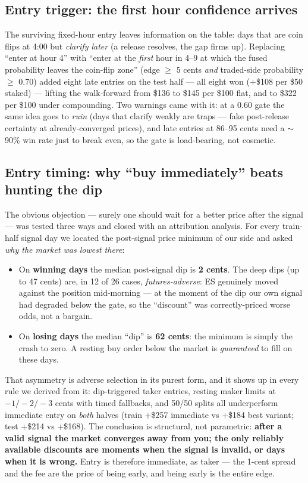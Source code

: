 \documentclass[11pt,a4paper]{article}
\begin{document}
\subsection{Entry trigger: the first hour confidence arrives}

The surviving fixed-hour entry leaves information on the table: days that are
coin flips at 4:00 but \emph{clarify later} (a release resolves, the gap
firms up). Replacing ``enter at hour 4'' with ``enter at the \emph{first}
hour in 4--9 at which the fused probability leaves the coin-flip zone''
(edge $\ge$ 5 cents \emph{and} traded-side probability $\ge$ 0.70) added
eight late entries on the test half --- all eight won (+\$108 per \$50
staked) --- lifting the walk-forward from \$136 to \$145 per \$100 flat, and
to \$322 per \$100 under compounding. Two warnings came with it: at a 0.60
gate the same idea goes to \emph{ruin} (days that clarify weakly are traps
--- fake post-release certainty at already-converged prices), and late
entries at 86--95 cents need a $\sim$90\% win rate just to break even, so
the gate is load-bearing, not cosmetic.

\subsection{Entry timing: why ``buy immediately'' beats hunting the dip}

The obvious objection --- surely one should wait for a better price after
the signal --- was tested three ways and closed with an attribution
analysis. For every train-half signal day we located the post-signal price
minimum of our side and asked \emph{why the market was lowest there}:

\begin{itemize}
\item On \textbf{winning days} the median post-signal dip is \textbf{2
cents}. The deep dips (up to 47 cents) are, in 12 of 26 cases,
\emph{futures-adverse}: ES genuinely moved against the position mid-morning
--- at the moment of the dip our own signal had degraded below the gate, so
the ``discount'' was correctly-priced worse odds, not a bargain.
\item On \textbf{losing days} the median ``dip'' is \textbf{62 cents}: the
minimum is simply the crash to zero. A resting buy order below the market is
\emph{guaranteed} to fill on these days.
\end{itemize}

That asymmetry is adverse selection in its purest form, and it shows up in
every rule we derived from it: dip-triggered taker entries, resting maker
limits at $-1/-2/-3$ cents with timed fallbacks, and 50/50 splits all
underperform immediate entry on \emph{both} halves (train +\$257 immediate
vs +\$184 best variant; test +\$214 vs +\$168). The conclusion is
structural, not parametric: \textbf{after a valid signal the market
converges away from you; the only reliably available discounts are moments
when the signal is invalid, or days when it is wrong.} Entry is therefore
immediate, as taker --- the 1-cent spread and the fee are the price of
being early, and being early is the entire edge.
\end{document}
